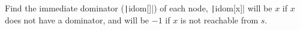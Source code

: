Find the immediate dominator (\texttt|idom[]|) of each node, \texttt|idom[x]| will be $x$ if $x$ does not have a dominator, and will be $-1$ if $x$ is not reachable from $s$. 

\inputminted{cpp}{src/graph/cut/dominator-tree.cpp.com}

